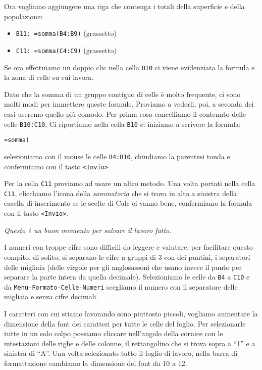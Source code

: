 Ora vogliamo aggiungere una riga che contenga i totali della superficie e
della popolazione:

\begin{itemize} [noitemsep]
\item \texttt{B11: =somma(B4:B9)} (grassetto)
\item \texttt{C11: =somma(C4:C9)} (grassetto)
\end{itemize}

Se ora effettuiamo un doppio clic nella cella \texttt{B10} ci viene evidenziata 
la
formula e la zona di celle su cui lavora.

Dato che la somma di un gruppo contiguo di celle è molto frequente, ci sono
molti modi per immettere queste formule. Proviamo a vederli, poi, a seconda
dei casi useremo quello più comodo. 
Per prima cosa cancelliamo il contenuto delle celle \texttt{B10:C10}.
Ci riportiamo nella cella \texttt{B10} e: iniziamo a scrivere la formula:

\texttt{=somma(}

selezioniamo con il mouse le celle \texttt{B4:B10},
chiudiamo la parentesi tonda e confermiamo con il tasto 
\texttt{\textless{}Invio\textgreater{}}

Per la cella \texttt{C11} proviamo ad usare un altro metodo.
Una volta portati nella cella \texttt{C11}, clicchiamo l'icona della 
\emph{sommatoria}
che si trova in alto a sinistra della casella di inserimento se le scelte
di Calc ci vanno bene, confermiamo la formula con il tasto 
\texttt{\textless{}Invio\textgreater{}}.

\emph{Questo è un buon momento per salvare il lavoro fatto.}

I numeri con troppe cifre sono difficili da leggere e valutare,
per facilitare questo compito, di solito, si separano le cifre a gruppi di 3
con dei puntini, i separatori delle migliaia
(delle virgole per gli anglosassoni che
usano invece il punto per separare la parte intera da quella decimale).
Selezioniamo le celle da \texttt{B4} a \texttt{C10} e da 
\texttt{Menu-Formato-Celle-Numeri}
scegliamo il numero con il separatore delle migliaia e senza cifre decimali.

I caratteri con cui stiamo lavorando sono piuttosto piccoli, vogliamo
aumentare la dimensione della font dei caratteri per tutte le celle del
foglio. Per selezionarle tutte in un solo colpo possiamo cliccare
nell'angolo della cornice con le intestazioni delle righe e delle colonne,
il rettangolino che si trova sopra a ``1'' e a sinistra di ``A''. Una volta
selezionato tutto il foglio di lavoro, nella barra di formattazione cambiamo
la dimensione del font da 10 a 12.

